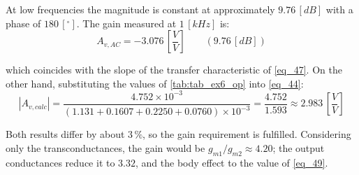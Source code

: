\documentclass[12pt,a4paper]{article}
\begin{document}
At low frequencies the magnitude is constant at approximately $9.76 \, [dB]$ with a phase of $180 \, [^{\circ}]$. The gain measured at $1 \, [kHz]$ is:
\begin{equation}
    A_{v,AC} = -3.076 \, \left[\frac{V}{V}\right] \qquad (9.76 \, [dB])
    \label{eq_48}
\end{equation}
 
which coincides with the slope of the transfer characteristic of \autoref{eq_47}. On the other hand, substituting the values of \autoref{tab:tab_ex6_op} into \autoref{eq_44}:
\begin{equation}
    |A_{v,calc}| = \frac{4.752 \times 10^{-3}}{(1.131 + 0.1607 + 0.2250 + 0.0760) \times 10^{-3}} = \frac{4.752}{1.593} \approx 2.983 \, \left[\frac{V}{V}\right]
    \label{eq_49}
\end{equation}
 
Both results differ by about $3 \, \%$, so the gain requirement is fulfilled. Considering only the transconductances, the gain would be $g_{m1}/g_{m2} \approx 4.20$; the output conductances reduce it to $3.32$, and the body effect to the value of \autoref{eq_49}.


\newpage
\end{document}
